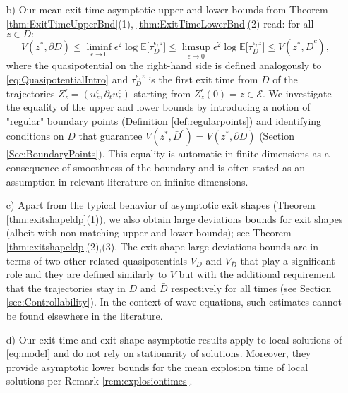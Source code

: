 \documentclass[10pt, reqno]{amsart}
\newcommand{\ex}{\mathbb{E}}
\newcommand{\e}{\mathcal{E}}
\theoremstyle{definition}
\numberwithin{lem}{section}
\numberwithin{cor}{section}
\numberwithin{prop}{section}
\numberwithin{thm}{section}
\numberwithin{dfn}{section}
\begin{document}
\begin{itemize}
\item[b)] Our mean exit time asymptotic upper and lower bounds from Theorem \ref{thm:ExitTimeUpperBnd}(1), \ref{thm:ExitTimeLowerBnd}(2)
    read: for all $z\in D:$
    \begin{equation}\label{eq:meanexittimeIntro}
         V(z^*, \partial D)\leq \liminf_{\epsilon\to 0}\epsilon^2\log\ex\big[ \tau_D^{\epsilon,z}\big]\leq \limsup_{\epsilon\to 0}\epsilon^2\log\ex\big[ \tau_D^{\epsilon,z}\big]\leq V(z^*, \bar{D}^c),    
    \end{equation}
    where the quasipotential on the right-hand side is defined analogously to \eqref{eq:QuasipotentialIntro} and
    $\tau_D^{\epsilon,z}$ is the first exit time from $D$ of the trajectories $Z^{\epsilon}_z=(u_z^\epsilon, \partial_t u_z^\epsilon)$ starting from $Z^{\epsilon}_z(0)=z\in\e.$ We investigate the equality of the upper and lower bounds by  introducing a notion of "regular" boundary points (Definition \ref{def:regularpoints}) and identifying conditions on $D$ that guarantee   $V(z^*, \bar{D}^c)=V(z^*, \partial D)$ (Section \ref{Sec:BoundaryPoints}). This equality is automatic in finite dimensions as a consequence of smoothness of the boundary and is often stated as an assumption in relevant literature on infinite dimensions. 
\item[c)] Apart from the typical behavior of asymptotic exit shapes (Theorem \ref{thm:exitshapeldp}(1)), we also obtain large deviations bounds for exit shapes (albeit with non-matching upper and lower bounds); see Theorem \ref{thm:exitshapeldp}(2),(3). The exit shape large deviations bounds are in terms of two other related quasipotentials $V_D$ and $V_{\bar{D}}$  that play a significant role and they are defined similarly to $V$ but with the additional requirement that the trajectories stay in $D$ and $\bar{D}$ respectively for  all times (see Section \ref{sec:Controllability}). In the context of wave equations, such estimates cannot be found elsewhere in the literature.
\item[d)] Our exit time and exit shape asymptotic results apply to local solutions of \eqref{eq:model} and do not rely on stationarity of solutions. 
Moreover, they provide asymptotic lower bounds for the mean explosion time of local solutions per Remark \ref{rem:explosiontimes}.
    \end{itemize}
    
\end{document}

